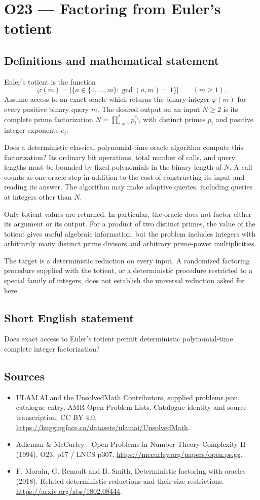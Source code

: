 \documentclass[11pt,a4paper]{article}
\begin{document}
\section*{O23 — Factoring from Euler's totient}\label{statement}

\subsection{Definitions and mathematical statement}
Euler's totient is the function
\[
\varphi(m)=|\{a\in\{1,\ldots,m\}:\gcd(a,m)=1\}|\qquad(m\ge1).
\]
Assume access to an exact oracle which returns the binary integer $\varphi(m)$ for every positive binary query $m$. The desired output on an input $N\ge2$ is its complete prime factorization $N=\prod_{i=1}^t p_i^{e_i}$, with distinct primes $p_i$ and positive integer exponents $e_i$.

Does a deterministic classical polynomial-time oracle algorithm compute this factorization? Its ordinary bit operations, total number of calls, and query lengths must be bounded by fixed polynomials in the binary length of $N$. A call counts as one oracle step in addition to the cost of constructing its input and reading its answer. The algorithm may make adaptive queries, including queries at integers other than $N$.

Only totient values are returned. In particular, the oracle does not factor either its argument or its output. For a product of two distinct primes, the value of the totient gives useful algebraic information, but the problem includes integers with arbitrarily many distinct prime divisors and arbitrary prime-power multiplicities.

The target is a deterministic reduction on every input. A randomized factoring procedure supplied with the totient, or a deterministic procedure restricted to a special family of integers, does not establish the universal reduction asked for here.
\subsection{Short English statement}
Does exact access to Euler’s totient permit deterministic polynomial-time complete integer factorization?
\subsection{Sources}
\begin{itemize}
\item[S1] ULAM.AI and the UnsolvedMath Contributors, supplied problems.json, catalogue entry, AMR Open Problem Lists. Catalogue identity and source transcription; CC BY 4.0.
\url{https://huggingface.co/datasets/ulamai/UnsolvedMath}.
\item[S2] Adleman \& McCurley - Open Problems in Number Theory Complexity II (1994), O23, p17 / LNCS p307. 
\url{https://mccurley.org/papers/open.ps.gz}.
\item[S3] F. Morain, G. Renault and B. Smith, Deterministic factoring with oracles (2018). Related deterministic reductions and their size restrictions.
\url{https://arxiv.org/abs/1802.08444}.
\end{itemize}
\end{document}
